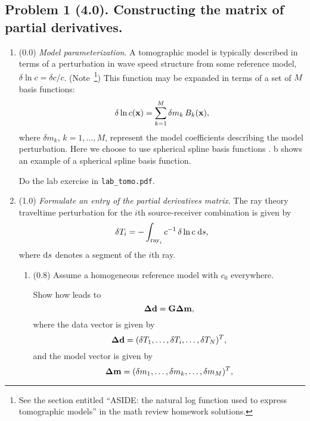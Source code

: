 \documentclass[11pt,titlepage,fleqn]{article}
\begin{document}

\subsection*{Problem 1 (4.0). Constructing the matrix of partial derivatives.}

\begin{enumerate}
\item (0.0) {\em Model parameterization}. A tomographic model is typically described in terms of a perturbation in wave speed structure from some reference model, \ie $\delta\ln c = \delta c/c$.
(Note~\footnote{See the section entitled ``ASIDE: the natural log function used to express tomographic models'' in the math review homework solutions.})
This function may be expanded in terms of a set of $M$ basis functions:
%
\begin{equation}
\delta\ln c(\mbox{${\bf x}$})=\sum_{k=1}^M \delta m_k\,B_k(\mbox{${\bf x}$}),
\label{dlnv}
\end{equation}
%
where $\delta m_k$, $k=1,\ldots,M$, represent the model coefficients describing the model perturbation.  Here we choose to use spherical spline basis functions \citep{WangDahlen1995spline,Wang1998}.
b shows an example of a spherical spline basis function.

Do the lab exercise in \verb+lab_tomo.pdf+.


\item (1.0) {\em Formulate an entry of the partial derivatives matrix}.
%
The ray theory traveltime perturbation for the $i$th source-receiver combination is given by
%
\begin{equation}
\delta T_i = -\int_{\mathrm{ray}_i} c^{-1}\,\delta\ln c\;\mathrm{d} s,
\label{ray_tomography}
\end{equation}
%
where $\mathrm{d} s$ denotes a segment of the $i$th ray.

\begin{enumerate}
\item (0.8) Assume a homogeneous reference model with $c_0$ everywhere.

Show how  leads to 
%
\begin{equation}
\mbox{\boldmath $\bf \Delta$}\mbox{${\bf d}$} = \mbox{${\bf G}$}\mbox{\boldmath $\bf \Delta$}\mbox{${\bf m}$},
\end{equation}
%
where the data vector is given by
%
\begin{equation}
\mbox{\boldmath $\bf \Delta$}\mbox{${\bf d}$} = (\delta T_1,\ldots,\delta T_i,\ldots,\delta T_N)^T,
\label{d}
\end{equation}
%
and the model vector is given by
%
\begin{equation}
\mbox{\boldmath $\bf \Delta$}\mbox{${\bf m}$} = (\delta m_1,\ldots,\delta m_k,\ldots,\delta m_M)^T,
\label{m}
\end{equation}


\end{enumerate}
\end{enumerate}
\end{document}
